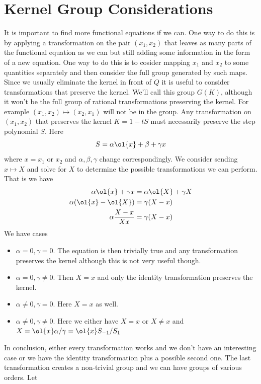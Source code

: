 \section{Kernel Group Considerations}
It is important to find more functional equations if we can. One way to do this is by applying a transformation on the pair $(x_1,x_2)$ that leaves as many parts of the functional equation as we can but still adding some information in the form of a new equation. One way to do this is to cosider mapping $x_1$ and $x_2$ to some quantities separately and then consider the full group generated by such maps. Since we usually eliminate the kernel in front of $Q$ it is useful to consider transformations that preserve the kernel.  We'll call this group $G(K)$, although it won't be the full group of rational transformations preserving the kernel. For example $(x_1,x_2) \mapsto (x_2,x_1)$ will not be in the group. Any transformation on $(x_1,x_2)$ that preserves the kernel $K = 1 -tS$ must necessarily preserve the step polynomial $S$. Here
\[
	S = \alpha \ol{x} + \beta + \gamma x
\]
where $x = x_1$ or $x_2$ and $\alpha,\beta,\gamma$ change correspondingly. We consider sending $x \mapsto X$ and solve for $X$ to determine the possible transformations we can perform. That is we have
\begin{align*}
	\alpha \ol{x} + \gamma x &=\alpha \ol{X} + \gamma X\\
	\alpha(\ol{x} - \ol{X}) &= \gamma (X-x)\\
	\alpha\frac{X-x}{Xx} &= \gamma (X-x)
\end{align*}
We have cases
\begin{itemize}
\item $\alpha = 0, \gamma = 0$. The equation is then trivially true and any transformation preserves the kernel although this is not very useful though.
\item $\alpha = 0, \gamma \neq 0$. Then $ X = x$ and only the identity transformation preserves the kernel.
\item $\alpha \neq 0, \gamma = 0$. Here $X = x$ as well.
\item $\alpha \neq 0, \gamma \neq 0$. Here we either have $X = x$ or $X\neq x$ and $X = \ol{x}\alpha/\gamma = \ol{x} S_{-1}/S_1$
\end{itemize}
In conclusion, either every transformation works and we don't have an interesting case or we have the identity transformation plus a possible second one. The last transformation creates a non-trivial group and we can have groups of various orders. Let
